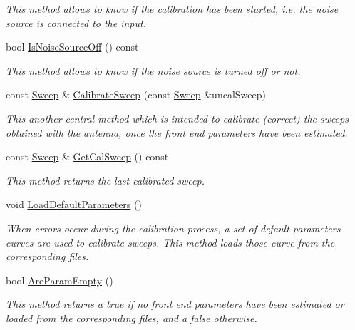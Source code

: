 \begin{DoxyCompactItemize}
\begin{DoxyCompactList}\small\item\em This method allows to know if the calibration has been started, i.\+e. the noise source is connected to the input. \end{DoxyCompactList}\item 
\mbox{\label{classFrontEndCalibrator_a0a10567c6a721f166e3ad63873813745}} 
bool \hyperlink{classFrontEndCalibrator_a0a10567c6a721f166e3ad63873813745}{Is\+Noise\+Source\+Off} () const
\begin{DoxyCompactList}\small\item\em This method allows to know if the noise source is turned off or not. \end{DoxyCompactList}\item 
const \hyperlink{structSweep}{Sweep} \& \hyperlink{classFrontEndCalibrator_afd5775502a0aa05976dccd6142ad46b0}{Calibrate\+Sweep} (const \hyperlink{structSweep}{Sweep} \&uncal\+Sweep)
\begin{DoxyCompactList}\small\item\em This another central method which is intended to calibrate (correct) the sweeps obtained with the antenna, once the front end parameters have been estimated. \end{DoxyCompactList}\item 
\mbox{\label{classFrontEndCalibrator_af4bca93a2737020967d428c2e698ca34}} 
const \hyperlink{structSweep}{Sweep} \& \hyperlink{classFrontEndCalibrator_af4bca93a2737020967d428c2e698ca34}{Get\+Cal\+Sweep} () const
\begin{DoxyCompactList}\small\item\em This method returns the last calibrated sweep. \end{DoxyCompactList}\item 
\mbox{\label{classFrontEndCalibrator_a5943d84aa272ed548dcc5ad61a65306b}} 
void \hyperlink{classFrontEndCalibrator_a5943d84aa272ed548dcc5ad61a65306b}{Load\+Default\+Parameters} ()
\begin{DoxyCompactList}\small\item\em When errors occur during the calibration process, a set of default parameters curves are used to calibrate sweeps. This method loads those curve from the corresponding files. \end{DoxyCompactList}\item 
\mbox{\label{classFrontEndCalibrator_a9a1173af037c656b63cce0f9dc1b51be}} 
bool \hyperlink{classFrontEndCalibrator_a9a1173af037c656b63cce0f9dc1b51be}{Are\+Param\+Empty} ()
\begin{DoxyCompactList}\small\item\em This method returns a {\ttfamily true} if no front end parameters have been estimated or loaded from the corresponding files, and a {\ttfamily false} otherwise. \end{DoxyCompactList}\end{DoxyCompactItemize}


